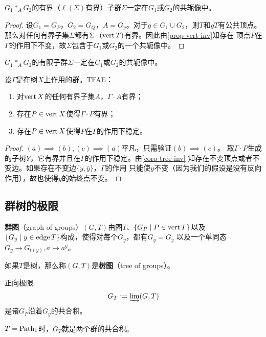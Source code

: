 \begin{theorem}
    $G_1*_A G_2$的有界（$\ell(\Sigma)$有界）子群$\Sigma$一定在$G_1$或$G_2$的共轭像中。
\end{theorem}
\begin{proof}
    设$G_1 = G_P$，$G_2 = G_Q$，$A = G_y$。对于$g \in G_1 \cup G_2$，则$T$和$gT$有公共顶点。
    那么对任何有界子集$\Sigma$都有$\Sigma \cdot (\operatorname{vert} T)$有界。因此由\ref{prop-vert-inv}知存在
    顶点$P$在$\Gamma$的作用下不变，故$\Sigma$包含于$G_1$或$G_2$的一个共轭像中。
\end{proof}
\begin{corollary}
    $G_1*_A G_2$的有限子群$\Sigma$一定在$G_1$或$G_2$的共轭像中。
\end{corollary}
\begin{proposition}\label{prop-vert-inv}
设$\Gamma$是在树$X$上作用的群。TFAE：
\begin{enumerate}
    \item[(a)] 对$\operatorname{vert} X$的任何有界子集$A$，$\Gamma\cdot A$有界；
    \item[(b)] 存在$P \in \operatorname{vert} X$使得$\Gamma \cdot P$有界；
    \item[(c)] 存在$P \in \operatorname{vert} X$使得$P$在$\Gamma$的作用下稳定。
\end{enumerate}
\end{proposition}
\begin{proof}
    $(a) \implies (b),(c) \implies (a)$平凡，只需验证$(b) \implies (c)$。
    取$\Gamma \cdot P$生成的子树$Y$，它有界并且在$\Gamma$的作用下稳定。由\ref{coro-tree-inv}
    知存在不变顶点或者不变边。如果存在不变边$\{y,\bar{y}\}$，$\Gamma$的作用
    只能使$y$不变（因为我们的假设是没有反向作用），故也使得$y$的始终点不变。
\end{proof}
\subsection{群树的极限}
\begin{definition}
    \textbf{群图}（graph of groups）$(G,T)$由图$T$、$\{G_P \mid P \in \operatorname{vert} T\}$以及
    $\{G_y \mid y \in \operatorname{edge} T\}$构成，使得对每个$G_y$，都有$G_y = G_{\bar{y}}$
    以及一个单同态$G_y \longrightarrow G_{t(y)},a \mapsto a^y$。

    如果$T$是树，那么称$(G,T)$是\textbf{树图}（tree of groups）。
\end{definition}
\begin{definition}
    正向极限\[G_T:=\varinjlim (G,T)\]是诸$G_P$沿着$G_y$的共合积。
\end{definition}
\begin{example}
    $T = \operatorname{Path}_1$时，$G_T$就是两个群的共合积。
\end{example}
